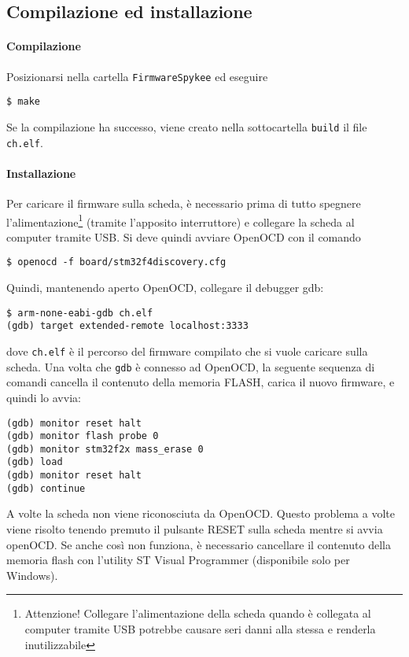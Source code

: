 \subsection*{Compilazione ed installazione}

\paragraph{Compilazione} Posizionarsi nella cartella \verb|FirmwareSpykee| ed eseguire
\begin{verbatim}
$ make
\end{verbatim}
Se la compilazione ha successo, viene creato nella sottocartella \verb|build| il file \verb|ch.elf|.

\paragraph{Installazione} Per caricare il firmware sulla scheda, è necessario prima di tutto spegnere l'alimentazione\footnote{Attenzione! Collegare l'alimentazione della scheda quando è collegata al computer tramite USB potrebbe causare seri danni alla stessa e renderla inutilizzabile} (tramite l'apposito interruttore) e collegare la scheda al computer tramite USB. Si deve quindi avviare OpenOCD con il comando
\begin{verbatim}
$ openocd -f board/stm32f4discovery.cfg
\end{verbatim}
Quindi, mantenendo aperto OpenOCD, collegare il debugger gdb:
\begin{verbatim}
$ arm-none-eabi-gdb ch.elf
(gdb) target extended-remote localhost:3333
\end{verbatim}
dove \verb|ch.elf| è il percorso del firmware compilato che si vuole caricare sulla scheda. Una volta che \verb|gdb| è connesso ad OpenOCD, la seguente sequenza di comandi cancella il contenuto della memoria FLASH, carica il nuovo firmware, e quindi lo avvia:
\begin{verbatim}
(gdb) monitor reset halt
(gdb) monitor flash probe 0 
(gdb) monitor stm32f2x mass_erase 0 
(gdb) load 
(gdb) monitor reset halt 
(gdb) continue
\end{verbatim}

\begin{nota} A volte la scheda non viene riconosciuta da OpenOCD. Questo problema a volte viene risolto tenendo premuto il pulsante RESET sulla scheda mentre si avvia openOCD. Se anche così non funziona, è necessario cancellare il contenuto della memoria flash con l'utility ST Visual Programmer (disponibile solo per Windows).
\end{nota}

